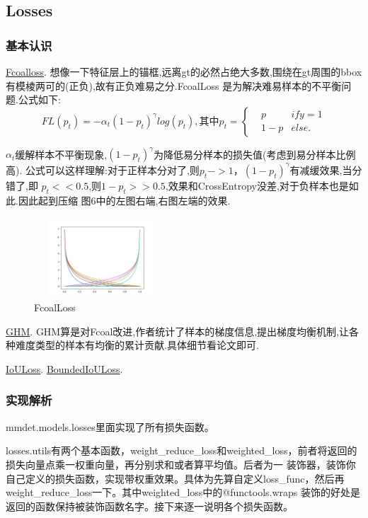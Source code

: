 \documentclass[UTF8]{ctexart}
\begin{document}
\subsection{Losses}
\label{sec:loss}
\subsubsection{基本认识}

\href{https://arxiv.org/abs/1708.02002}{Fcoalloss}.
想像一下特征层上的锚框,远离gt的必然占绝大多数,围绕在gt周围的bbox有模棱两可的(正负),故有正负难易之分.FcoalLoss 是为解决难易样本的不平衡问题.公式如下:
\begin{equation}
	FL(p_t) = -\alpha_{t}(1-p_t)^{\gamma}log(p_t),\text{其中}
	p_t=\left\{
	\begin{aligned}
	&p & if y =1\\
	&1-p & else.
	\end{aligned}
	\right.
\end{equation}

$\alpha_t$缓解样本不平衡现象,$(1-p_t)^{\gamma}$为降低易分样本的损失值(考虑到易分样本比例高).
公式可以这样理解:对于正样本分对了,则$p_t->1$，$(1-p_t)^{\gamma}$有减缓效果,当分错了,即
$p_t << 0.5$,则$1-p_t >>0.5$,效果和CrossEntropy没差,对于负样本也是如此.因此起到压缩
图6中的左图右端,右图左端的效果.

\begin{figure}[htbp]
	\centering
	\includegraphics[width=5cm,height=3cm]{./pic/Focal_01.png}
	\caption{FcoalLoss}
\end{figure}

\href{https://arxiv.org/abs/1811.05181}{GHM}.
GHM算是对Fcoal改进,作者统计了样本的梯度信息,提出梯度均衡机制,让各种难度类型的样本有均衡的累计贡献.具体细节看论文即可.

\href{https://arxiv.org/abs/1908.03851}{IoULoss}.
\href{https://arxiv.org/abs/1711.00164}{BoundedIoULoss}.

\subsubsection{实现解析}
mmdet.models.losses里面实现了所有损失函数。

losses.utils有两个基本函数，weight\_reduce\_loss和weighted\_loss，前者将返回的损失向量点乘一权重向量，再分别求和或者算平均值。后者为一
装饰器，装饰你自己定义的损失函数，实现带权重效果。具体为先算自定义loss\_func，然后再weight\_reduce\_loss一下。其中weighted\_loss中的@functools.wraps
装饰的好处是返回的函数保持被装饰函数名字。接下来逐一说明各个损失函数。
\end{document}
